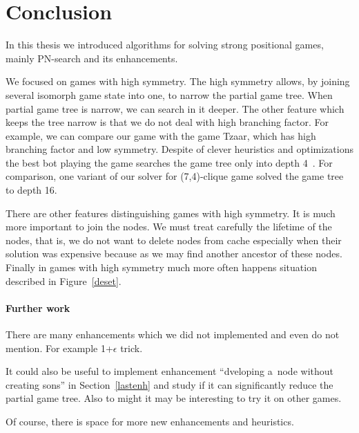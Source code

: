 \chapter*{Conclusion}

In this thesis we introduced algorithms for solving strong positional games,
mainly PN-search and its enhancements.

We focused on games with high symmetry. The high symmetry allows, by joining
several isomorph game state into one, to narrow the partial game tree. When
partial game tree is narrow, we can search in it deeper. The other feature which
keeps the tree narrow is that we do not deal with high branching factor. For
example, we can compare our game with the game Tzaar, which has high branching
factor and low symmetry. Despite of clever heuristics and optimizations the
best bot playing the game searches the game tree only into depth
4~\cite{paulie}. For comparison, one variant of our solver for (7,4)-clique
game solved the game tree to depth 16.

There are other features distinguishing games with high symmetry. It is much
more important to join the nodes. We must treat carefully the lifetime of
the nodes, that is, we do not want to delete nodes from cache especially when their
solution was expensive because as we may find another ancestor of these nodes.
Finally in games with high symmetry much more often happens situation described
in Figure~\ref{deset}.

\subsubsection{Further work}

There are many enhancements which we did not implemented and even do
not mention. For example 1+$\epsilon$ trick.

It could also be useful to implement enhancement ``dveloping a~node without creating sons''
in Section~\ref{lastenh} and study if it can significantly reduce the partial game
tree. Also to might it may be interesting to try it on other games.

Of course, there is space for more new enhancements and heuristics. 



